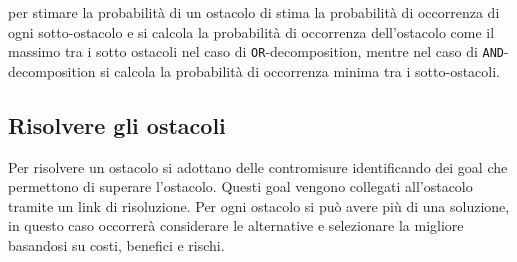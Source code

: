 per stimare la probabilità di un ostacolo di stima la probabilità di occorrenza di ogni
sotto-ostacolo e si calcola la probabilità di occorrenza dell'ostacolo come il massimo 
tra i sotto ostacoli nel caso di \texttt{OR}-decomposition, mentre
nel caso di \texttt{AND}-decomposition si calcola la probabilità di occorrenza minima tra i
sotto-ostacoli.
\subsection{Risolvere gli ostacoli}
\begin{figure}[H]
    \centering
\end{figure}
Per risolvere un ostacolo si adottano delle contromisure identificando dei goal 
che permettono di superare l'ostacolo. Questi goal vengono collegati all'ostacolo
tramite un link di risoluzione.
Per ogni ostacolo si può avere più di una soluzione, in questo caso occorrerà 
considerare le alternative e selezionare la migliore basandosi su costi, benefici e rischi.

